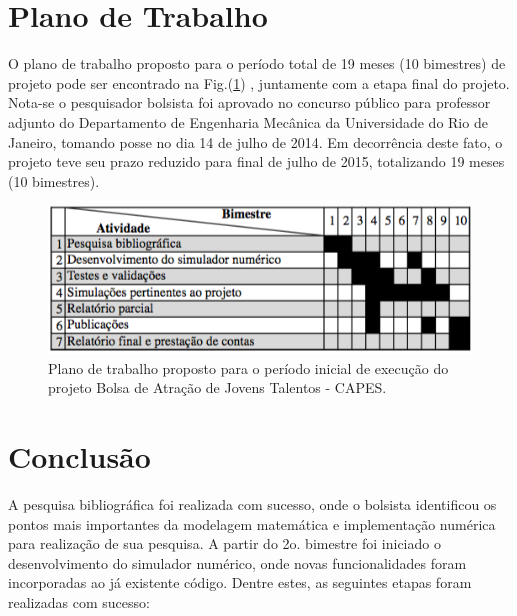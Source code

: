 \documentclass[a4paper,portuges,12pt]{article}
\begin{document}
\section{Plano de Trabalho}

O plano de trabalho proposto para o período total de 19 meses (10
bimestres) de projeto pode ser encontrado na Fig.(\ref{fig:plano}) ,
juntamente com a etapa final do projeto. Nota-se o pesquisador bolsista
foi aprovado no concurso público para professor adjunto do Departamento
de Engenharia Mecânica da Universidade do Rio de Janeiro, tomando posse
no dia 14 de julho de 2014. Em decorrência deste fato, o projeto teve
seu prazo reduzido para final de julho de 2015, totalizando 19 meses (10
bimestres). 

 \begin{figure}[hb!]
 	\begin{center}
 		\includegraphics[angle=0, scale=0.75]{figs/plano.png}
 	\end{center}
 	\caption{Plano de trabalho proposto para o período inicial de
	execução do projeto Bolsa de Atração de Jovens Talentos - CAPES.}
 	\label{fig:plano} 
 \end{figure}


\section{Conclusão}

A pesquisa bibliográfica foi realizada com sucesso, onde o bolsista
identificou os pontos mais importantes da modelagem matemática e
implementação numérica para realização de sua pesquisa. A partir do 2o.
bimestre foi iniciado o desenvolvimento do simulador numérico, onde
novas funcionalidades foram incorporadas ao já existente código. Dentre
estes, as seguintes etapas foram realizadas com sucesso:
\end{document}
